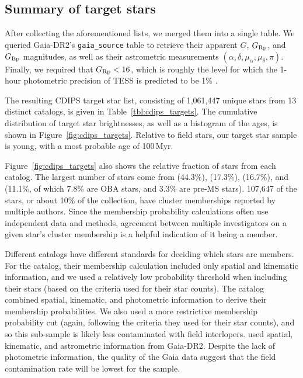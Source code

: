 \documentclass[12pt,twocolumn,tighten]{aastex62}
\begin{document}
\subsection{Summary of target stars}
\label{subsec:ocmgsummary}


After collecting the aforementioned lists, we merged them into a
single table. We queried Gaia-DR2's \texttt{gaia\_source} table to
retrieve their apparent $G$, $G_{\rm Rp}$, and $G_{\rm Bp}$
magnitudes, as well as their astrometric measurements $(\alpha,
\delta, \mu_\alpha, \mu_\delta, \pi)$.  Finally, we required that
$G_{\rm Rp} < 16$, which is roughly the level for which the 1-hour
photometric precision of TESS is predicted to be 1\%
\citep{ricker_transiting_2015}.

The resulting CDIPS target star list, consisting of 1{,}061{,}447
unique stars from 13 distinct catalogs, is given in
Table~\ref{tbl:cdips_targets}.  The cumulative distribution of target
star brightnesses, as well as a histogram of the ages, is shown in
Figure~\ref{fig:cdips_targets}.  Relative to field stars, our target
star sample is young, with a most probable age of 100$\,$Myr.

Figure~\ref{fig:cdips_targets} also shows the relative fraction of
stars from each catalog.  The largest number of stars come from
\citealt{dias_proper_2014} (44.3\%), \citealt{Kharchenko_et_al_2013}
(17.3\%), \citealt{cantat-gaudin_gaia_2018} (16.7\%), and
\citealt{zari_3d_2018} (11.1\%, of which 7.8\% are OBA stars, and
3.3\% are pre-MS stars).  107{,}647 of the stars, or about 10\% of the
collection, have cluster memberships reported by multiple authors.
Since the membership probability calculations often use independent
data and methods, agreement between multiple investigators on a given
star's cluster membership is a helpful indication of it being a
member.

Different catalogs have different standards for deciding which stars
are members.  For the \citet{dias_proper_2014} catalog, their
membership calculation included only spatial and kinematic
information, and we used a relatively low probability threshold when
including their stars (based on the criteria
\citealt{dias_proper_2014} used for their star counts).  The
\citet{Kharchenko_et_al_2013} catalog combined spatial, kinematic, and
photometric information to derive their membership probabilities.  We
also used a more restrictive membership probability cut (again,
following the criteria they used for their star counts), and so this
sub-sample is likely less contaminated with field interlopers.
\citet{cantat-gaudin_gaia_2018} used spatial, kinematic, and
astrometric information from Gaia-DR2. Despite the lack of photometric
information, the quality of the Gaia data suggest that the field
contamination rate will be lowest for the
\citet{cantat-gaudin_gaia_2018} sample.
\end{document}
